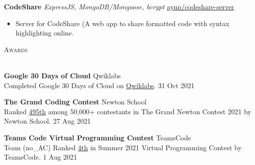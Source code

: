\documentclass[a4paper]{article}
\newcommand{\lineunder} {
    \vspace*{-8pt} \\
    \hspace*{-18pt} \hrulefill \\
}
\newcommand{\header} [1] {
    {\hspace*{-18pt}\vspace*{6pt} \textsc{#1}}
    \vspace*{-6pt} \lineunder
}
\begin{document}


{\textbf{CodeShare}} {\sl ExpressJS, MongoDB/Mongoose, bcrypt} \hfill \href{https://github.com/aynp/codeshare-server}{aynp/codeshare-server}\\
\begin{itemize}
	\item Server for CodeShare (A web app to share formatted code with syntax highlighting online.
\end{itemize}
\vspace*{1.5mm}



\header{Awards}
\vspace{1mm}

\textbf{Google 30 Days of Cloud} \hfill Qwiklabs\\
Completed Google 30 Days of Cloud on \href{https://www.qwiklabs.com/public_profiles/4c78c6d8-ad43-4991-b8fe-03e559c1bac5}{Qwiklabs}. \hfill 31 Oct 2021\\
\vspace*{1mm}

\textbf{The Grand Coding Contest} \hfill Newton School\\
Ranked \href{https://www.linkedin.com/posts/aryanpathania03_aryan-has-secured-rank-495-in-newtons-grand-activity-6841777869484642304-YhKD}{495th} among 50,000+ contestants in The Grand Newton Contest 2021 by Newton School. \hfill 27 Aug 2021\\
\vspace*{1mm}

\textbf{Teams Code Virtual Programming Contest} \hfill TeamsCode\\
Team (no\_AC) Ranked \href{https://youtu.be/eCylTCHctY0?t=16137}{4th} in Summer 2021 Virtual Programming Contest by TeamsCode. \hfill 1 Aug 2021\\
\vspace*{1mm}
\end{document}
